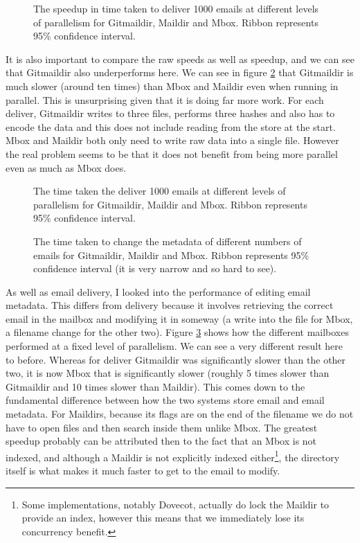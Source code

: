 \begin{figure}[h]
    \centering
    
    \caption{The speedup in time taken to deliver 1000 emails at different levels of parallelism for Gitmaildir, Maildir and Mbox. Ribbon represents 95\% confidence interval.}
    \label{fig:tdpp_speedup_combined}
\end{figure}

It is also important to compare the raw speeds as well as speedup, and we can see that Gitmaildir also underperforms here. We can see in figure \ref{fig:tdpp_combined} that Gitmaildir is much slower (around ten times) than Mbox and Maildir even when running in parallel. This is unsurprising given that it is doing far more work. For each deliver, Gitmaildir writes to three files, performs three hashes and also has to encode the data and this does not include reading from the store at the start. Mbox and Maildir both only need to write raw data into a single file. However the real problem seems to be that it does not benefit from being more parallel even as much as Mbox does.

\begin{figure}[h]
    \centering
    
    \caption{The time taken the deliver 1000 emails at different levels of parallelism for Gitmaildir, Maildir and Mbox. Ribbon represents 95\% confidence interval.}
    \label{fig:tdpp_combined}
\end{figure}

\begin{figure}[h]
    \centering
    
  \caption{The time taken to change the metadata of different numbers of emails for Gitmaildir, Maildir and Mbox. Ribbon represents 95\% confidence interval (it is very narrow and so hard to see).}
    \label{fig:tmp_combined}
\end{figure}

As well as email delivery, I looked into the performance of editing email metadata. This differs from delivery because it involves retrieving the correct email in the mailbox and modifying it in someway (a write into the file for Mbox, a filename change for the other two). Figure \ref{fig:tmp_combined} shows how the different mailboxes performed at a fixed level of parallelism. We can see a very different result here to before. Whereas for deliver Gitmaildir was significantly slower than the other two, it is now Mbox that is significantly slower (roughly 5 times slower than Gitmaildir and 10 times slower than Maildir). This comes down to the fundamental difference between how the two systems store email and email metadata. For Maildirs, because its flags are on the end of the filename we do not have to open files and then search inside them unlike Mbox. The greatest speedup probably can be attributed then to the fact that an Mbox is not indexed, and although a Maildir is not explicitly indexed either\footnote{Some implementations, notably Dovecot\cite{dovecot_maildir}, actually do lock the Maildir to provide an index, however this means that we immediately lose its concurrency benefit.}, the directory itself is what makes it much faster to get to the email to modify.

